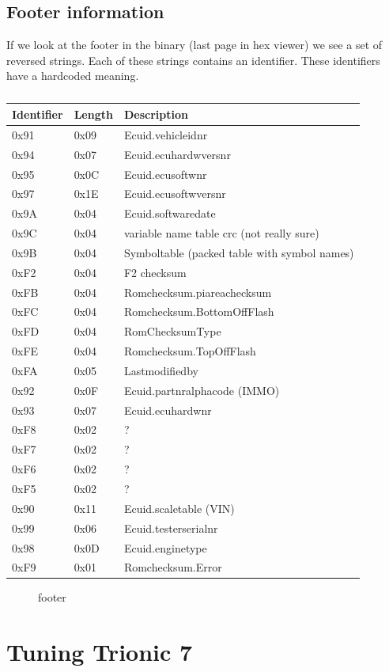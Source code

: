 \documentclass[11pt,a4paper]{book}
\newcommand{\Mfig}[1]{%
\begin{figure}[<+htpb+>]
    \centering
    \missingfigure{#1}
    \caption{#1}
\end{figure}}
\begin{document}
\section{Footer information}
If we look at the footer in the binary (last page in hex viewer) we see a set of reversed strings. Each
of these strings contains an identifier. These identifiers have a hardcoded meaning.

\begin{table}
    \centering
    \begin{tabular}{lll}
Identifier & Length & Description \\
\midrule
0x91& 0x09& Ecuid.vehicleidnr \\
0x94 & 0x07 & Ecuid.ecuhardwversnr \\
0x95 & 0x0C & Ecuid.ecusoftwnr \\
0x97 & 0x1E & Ecuid.ecusoftwversnr \\
0x9A & 0x04 & Ecuid.softwaredate \\
0x9C & 0x04 & variable name table crc (not really sure) \\
0x9B & 0x04 & Symboltable (packed table with symbol names) \\
0xF2 & 0x04 & F2 checksum \\
0xFB & 0x04 & Romchecksum.piareachecksum \\
0xFC & 0x04 & Romchecksum.BottomOffFlash \\
0xFD & 0x04 & RomChecksumType \\
0xFE & 0x04 & Romchecksum.TopOffFlash \\
0xFA & 0x05 & Lastmodifiedby \\
0x92 & 0x0F & Ecuid.partnralphacode (IMMO) \\
0x93 & 0x07 & Ecuid.ecuhardwnr \\
0xF8 & 0x02 & ? \\
0xF7 & 0x02 & ? \\
0xF6 & 0x02 & ? \\
0xF5 & 0x02 & ? \\
0x90 & 0x11 & Ecuid.scaletable (VIN) \\
0x99 & 0x06 & Ecuid.testerserialnr \\
0x98 & 0x0D & Ecuid.enginetype \\
0xF9 & 0x01 & Romchecksum.Error
\end{tabular}
    \caption{}
    \label{tab:}
\end{table}
\Mfig{footer}

\chapter{Tuning Trionic 7}
\end{document}
